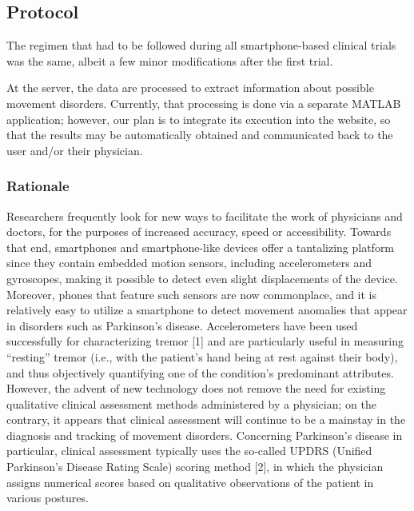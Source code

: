 \subsection{Protocol}
\label{subsec:SmartCT2Protocol}

The regimen that had to be followed during all smartphone-based clinical trials was the same, albeit a few minor modifications after the first trial. 

At the server, the data are processed to extract information about possible movement disorders. Currently, that processing is done via a separate MATLAB application; however, our plan is to integrate its execution into the website, so that the results may be automatically obtained and communicated back to the user and/or their physician.  


\subsubsection{Rationale}
\label{subsubsec:smartCT2Rationale}
Researchers frequently look for new ways to facilitate the work of physicians and doctors, for the purposes of increased accuracy, speed or accessibility. Towards that end, smartphones and smartphone-like devices offer a tantalizing platform since they contain embedded motion sensors, including accelerometers and gyroscopes, making it possible to detect even slight displacements of the device. Moreover, phones that feature such sensors are now commonplace, and it is relatively easy to utilize a smartphone to detect movement anomalies that appear in disorders such as Parkinson’s disease. Accelerometers have been used successfully for characterizing tremor [1] and are particularly useful in measuring “resting” tremor (i.e., with the patient’s hand being at rest against their body), and thus objectively quantifying one of the condition’s predominant attributes. However, the advent of new technology does not remove the need for existing qualitative clinical assessment methods administered by a physician; on the contrary, it appears that clinical assessment will continue to be a mainstay in the diagnosis and tracking of movement disorders. Concerning Parkinson’s disease in particular, clinical assessment typically uses the so-called UPDRS (Unified Parkinson’s Disease Rating Scale) scoring method [2], in which the physician assigns numerical scores based on qualitative observations of the patient in various postures. 

